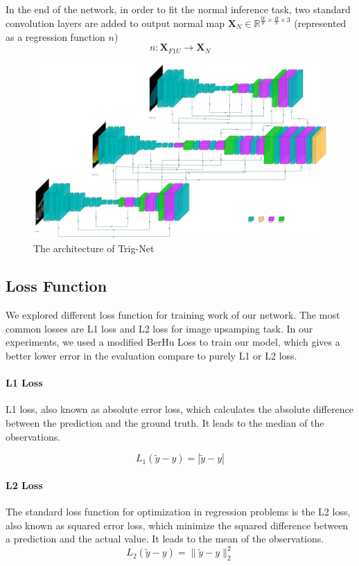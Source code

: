 In the end of the network, in order to fit the normal inference task, two standard convolution layers are added to output normal map $ \textbf{X}_{N} \in  \mathbb{R}^{\frac{W}{8}\times \frac{H}{8}\times 3} $ (represented as a regression function $ n $)
\[n:\textbf{X}_{F1U} \rightarrow  \textbf{X}_{N} \] 

\begin{figure}
	\centering
	\includegraphics[width=1\textwidth]{Figures/trignet} %
	\decoRule
	\caption{The architecture of Trig-Net}
	\label{fig:Trig-Net}
\end{figure}




\subsection{Loss Function}
We explored different loss function for training work of our network. The most common losses are L1 loss and L2 loss for image upsamping task. In our experiments, we used a modified BerHu Loss to train our model, which gives a better lower error in the evaluation compare to purely L1 or L2 loss. 
\paragraph{L1 Loss}
L1 loss, also known as absolute error loss, which calculates the absolute difference between the prediction and the ground truth. It leads to the median of the observations.

\[ L_1(\tilde y - y) = |\tilde y - y | \]

\paragraph{L2 Loss}
The standard loss function for optimization in regression problems is the L2 loss, also known as squared error loss, which minimize the squared difference between a prediction and the actual value. It leads to the mean of the observations. 
\[ L_2(\tilde y - y) = \|\tilde y - y \|_2^2 \]


